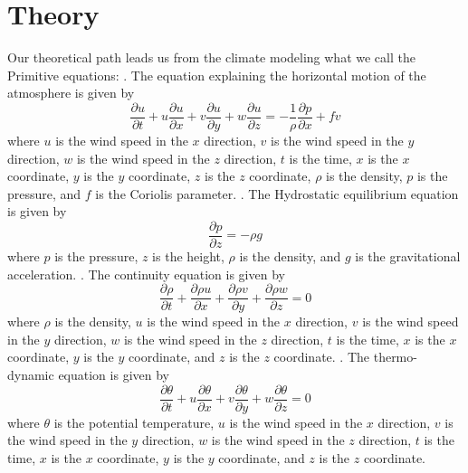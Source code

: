 \documentclass{article}
\begin{document}
\section{Theory}
Our theoretical path leads us from the climate modeling what we call the Primitive equations:
. The equation explaining the horizontal motion of the atmosphere is given by
\begin{equation}
\frac{\partial u}{\partial t} + u \frac{\partial u}{\partial x} + v \frac{\partial u}{\partial y} + w \frac{\partial u}{\partial z} = - \frac{1}{\rho} \frac{\partial p}{\partial x} + fv
\end{equation}
where $u$ is the wind speed in the $x$ direction, $v$ is the wind speed in the $y$ direction, $w$ is the wind speed in the $z$ direction, $t$ is the time, $x$ is the $x$ coordinate, $y$ is the $y$ coordinate, $z$ is the $z$ coordinate, $\rho$ is the density, $p$ is the pressure, and $f$ is the Coriolis parameter.
. The Hydrostatic equilibrium equation is given by
\begin{equation}
\frac{\partial p}{\partial z} = - \rho g
\end{equation}
where $p$ is the pressure, $z$ is the height, $\rho$ is the density, and $g$ is the gravitational acceleration.
. The continuity equation is given by
\begin{equation}
\frac{\partial \rho}{\partial t} + \frac{\partial \rho u}{\partial x} + \frac{\partial \rho v}{\partial y} + \frac{\partial \rho w}{\partial z} = 0
\end{equation}
where $\rho$ is the density, $u$ is the wind speed in the $x$ direction, $v$ is the wind speed in the $y$ direction, $w$ is the wind speed in the $z$ direction, $t$ is the time, $x$ is the $x$ coordinate, $y$ is the $y$ coordinate, and $z$ is the $z$ coordinate.
. The thermo-dynamic equation is given by
\begin{equation}
\frac{\partial \theta}{\partial t} + u \frac{\partial \theta}{\partial x} + v \frac{\partial \theta}{\partial y} + w \frac{\partial \theta}{\partial z} = 0
\end{equation}
where $\theta$ is the potential temperature, $u$ is the wind speed in the $x$ direction, $v$ is the wind speed in the $y$ direction, $w$ is the wind speed in the $z$ direction, $t$ is the time, $x$ is the $x$ coordinate, $y$ is the $y$ coordinate, and $z$ is the $z$ coordinate.
\end{document}
